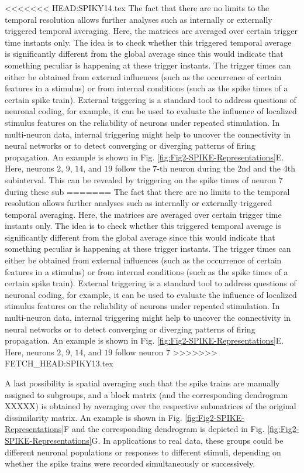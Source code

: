 \documentclass[10pt,twocolumn]{elsart5p}
\begin{document}
<<<<<<< HEAD:SPIKY14.tex
The fact that there are no limits to the temporal resolution allows further analyses such as internally or externally triggered temporal averaging. Here, the matrices are averaged over certain trigger time instants only. The idea is to check whether this triggered temporal average is significantly different from the global average since this would indicate that something peculiar is happening at these trigger instants. The trigger times can either be obtained from external influences (such as the occurrence of certain features in a stimulus) or from internal conditions (such as the spike times of a certain spike train). External triggering is a standard tool to address questions of neuronal coding, for example, it can be used to evaluate the influence of localized stimulus features on the reliability of neurons under repeated stimulation. In multi-neuron data, internal triggering might help to uncover the connectivity in neural networks or to detect converging or diverging patterns of firing propagation. An example is shown in Fig. \ref{fig:Fig2-SPIKE-Representations}E. Here, neurons $2$, $9$, $14$, and $19$ follow the $7$-th neuron during the 2nd and the 4th subinterval. This can be revealed by triggering on the spike times of neuron $7$ during these sub
=======
The fact that there are no limits to the temporal resolution allows further analyses such as internally or externally triggered temporal averaging. Here, the matrices are averaged over certain trigger time instants only. The idea is to check whether this triggered temporal average is significantly different from the global average since this would indicate that something peculiar is happening at these trigger instants. The trigger times can either be obtained from external influences (such as the occurrence of certain features in a stimulus) or from internal conditions (such as the spike times of a certain spike train). External triggering is a standard tool to address questions of neuronal coding, for example, it can be used to evaluate the influence of localized stimulus features on the reliability of neurons under repeated stimulation. In multi-neuron data, internal triggering might help to uncover the connectivity in neural networks or to detect converging or diverging patterns of firing propagation. An example is shown in Fig. \ref{fig:Fig2-SPIKE-Representations}E. Here, neurons $2$, $9$, $14$, and $19$ follow neuron $7$ 
>>>>>>> FETCH_HEAD:SPIKY13.tex

A last possibility is spatial averaging such that the spike trains are manually assigned to subgroups, and a block matrix (and the corresponding dendrogram XXXXX) is obtained by averaging over the respective submatrices of the original dissimilarity matrix. An example is shown in Fig. \ref{fig:Fig2-SPIKE-Representations}F and the corresponding dendrogram is depicted in Fig. \ref{fig:Fig2-SPIKE-Representations}G. In applications to real data, these groups could be different neuronal populations or responses to different stimuli, depending on whether the spike trains were recorded simultaneously or successively.
\end{document}
